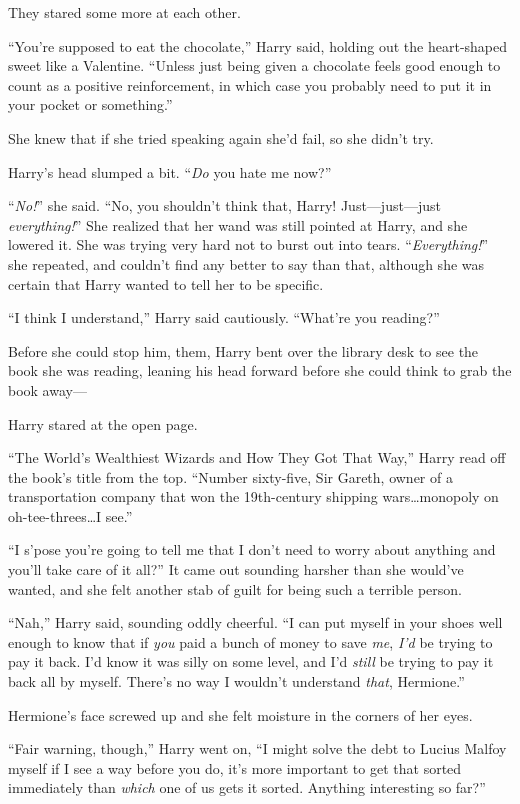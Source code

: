 They stared some more at each other.

“You’re supposed to eat the chocolate,” Harry said, holding out the heart-shaped sweet like a Valentine. “Unless just being given a chocolate feels good enough to count as a positive reinforcement, in which case you probably need to put it in your pocket or something.”

She knew that if she tried speaking again she’d fail, so she didn’t try.

Harry’s head slumped a bit. “\emph{Do} you hate me now?”

“\emph{No!}” she said. “No, you shouldn’t think that, Harry! Just—just—just \emph{everything!}” She realized that her wand was still pointed at Harry, and she lowered it. She was trying very hard not to burst out into tears. “\emph{Everything!}” she repeated, and couldn’t find any better to say than that, although she was certain that Harry wanted to tell her to be specific.

“I think I understand,” Harry said cautiously. “What’re you reading?”

Before she could stop him, them, Harry bent over the library desk to see the book she was reading, leaning his head forward before she could think to grab the book away—

Harry stared at the open page.

“The World’s Wealthiest Wizards and How They Got That Way,” Harry read off the book’s title from the top. “Number sixty-five, Sir Gareth, owner of a transportation company that won the 19th-century shipping wars…monopoly on oh-tee-threes…I see.”

“I s’pose you’re going to tell me that I don’t need to worry about anything and you’ll take care of it all?” It came out sounding harsher than she would’ve wanted, and she felt another stab of guilt for being such a terrible person.

“Nah,” Harry said, sounding oddly cheerful. “I can put myself in your shoes well enough to know that if \emph{you} paid a bunch of money to save \emph{me}, \emph{I’d} be trying to pay it back. I’d know it was silly on some level, and I’d \emph{still} be trying to pay it back all by myself. There’s no way I wouldn’t understand \emph{that}, Hermione.”

Hermione’s face screwed up and she felt moisture in the corners of her eyes.

“Fair warning, though,” Harry went on, “I might solve the debt to Lucius Malfoy myself if I see a way before you do, it’s more important to get that sorted immediately than \emph{which} one of us gets it sorted. Anything interesting so far?”

